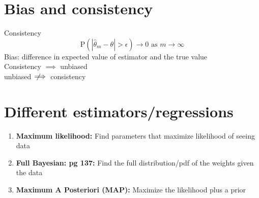 \documentclass{article}
\newcommand{\beq}{\begin{equation}}
\newcommand{\eeq}{\end{equation}}
\newcommand{\notimplies}{\;\not\!\!\!\implies}
\begin{document}
\section{Bias and consistency}
Consistency
\beq
\text{P}(|\hat{\theta}_m - \theta|>\epsilon) \rightarrow 0 \text{ as } m \rightarrow \infty 
\eeq
Bias: difference in expected value of estimator and the true value\\
Consistency $\implies$ unbiased\\
unbiased $\notimplies$ consistency
%
%
\section{Different estimators/regressions}
\begin{enumerate}
\item{\textbf{Maximum likelihood: } Find parameters that maximize likelihood of seeing data}
\item{\textbf{Full Bayesian: pg 137:} Find the full distribution/pdf of the weights given the data}
\item{\textbf{Maximum A Posteriori (MAP):} Maximize the likelihood plus a prior}  
\end{enumerate}
%
%
\end{document}
